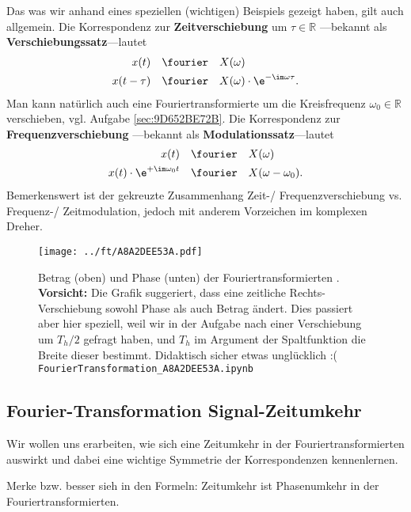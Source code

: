 \begin{Loesung}
Das was wir anhand eines speziellen (wichtigen) Beispiels gezeigt haben, gilt auch
allgemein. Die Korrespondenz zur \textbf{Zeitverschiebung} um $\tau\in\mathbb{R}$
---bekannt als \textbf{Verschiebungssatz}---lautet
\begin{align}
x(t) & \quad \fourier \quad X(\omega)\\
x(t - \tau) & \quad \fourier \quad X(\omega) \cdot \e^{-\im\omega \tau}.
\end{align}
%
Man kann natürlich auch eine Fouriertransformierte um die Kreisfrequenz
$\omega_0\in\mathbb{R}$ verschieben, vgl. Aufgabe \ref{sec:9D652BE72B}.
%
Die Korrespondenz zur \textbf{Frequenzverschiebung}
---bekannt als \textbf{Modulationssatz}---lautet
\begin{align}
x(t) & \quad \fourier \quad X(\omega)\\
\label{eq:A8A2DEE53A_ModTheoremTime}
x(t) \cdot \e^{+\im\omega_0 t} & \quad \fourier \quad X(\omega-\omega_0).
\end{align}
%
Bemerkenswert ist der gekreuzte Zusammenhang Zeit-/ Frequenzverschiebung
vs.
Frequenz-/ Zeitmodulation,
jedoch mit anderem Vorzeichen
im komplexen Dreher.
\end{Loesung}

\begin{figure}[h!]
\centering
\texttt{[image: ../ft/A8A2DEE53A.pdf]}
  \caption{Betrag (oben) und Phase (unten) der Fouriertransformierten .
\textbf{Vorsicht:} Die Grafik suggeriert, dass eine zeitliche Rechts-Verschiebung
sowohl Phase als auch Betrag ändert. Dies passiert aber hier speziell, weil wir in der
Aufgabe nach einer Verschiebung um $T_h/2$ gefragt haben, und $T_h$
im Argument der Spaltfunktion die Breite dieser bestimmt. Didaktisch sicher etwas unglücklich :(
\texttt{FourierTransformation\_A8A2DEE53A.ipynb}}
  \label{fig:A8A2DEE53A}
\end{figure}


\clearpage
\subsection{Fourier-Transformation Signal-Zeitumkehr}
\label{sec:1CFE5FE3A1}
\begin{Ziel}
Wir wollen uns erarbeiten, wie sich eine Zeitumkehr in der Fouriertransformierten
auswirkt und dabei eine wichtige Symmetrie der Korrespondenzen kennenlernen.

Merke bzw. besser sieh in den Formeln: Zeitumkehr ist Phasenumkehr in der Fouriertransformierten.
\end{Ziel}

